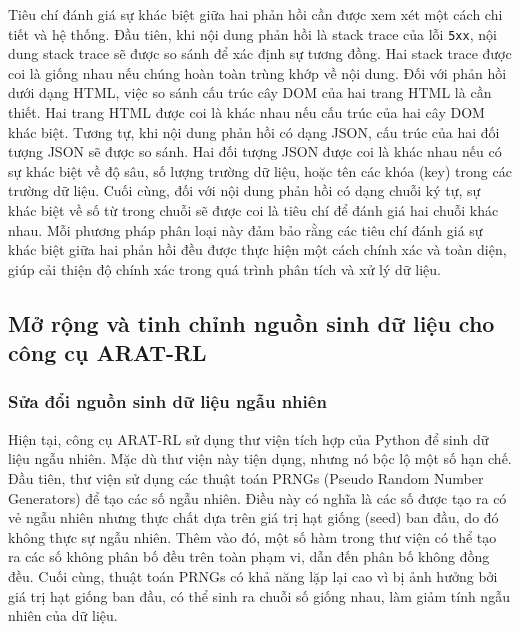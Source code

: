 Tiêu chí đánh giá sự khác biệt giữa hai phản hồi cần được xem xét một cách chi tiết và hệ thống. Đầu tiên, khi nội dung phản hồi là stack trace của lỗi \texttt{5xx}, nội dung stack trace sẽ được so sánh để xác định sự tương đồng. Hai stack trace được coi là giống nhau nếu chúng hoàn toàn trùng khớp về nội dung. Đối với phản hồi dưới dạng HTML, việc so sánh cấu trúc cây DOM của hai trang HTML là cần thiết. Hai trang HTML được coi là khác nhau nếu cấu trúc của hai cây DOM khác biệt. Tương tự, khi nội dung phản hồi có dạng JSON, cấu trúc của hai đối tượng JSON sẽ được so sánh. Hai đối tượng JSON được coi là khác nhau nếu có sự khác biệt về độ sâu, số lượng trường dữ liệu, hoặc tên các khóa (key) trong các trường dữ liệu. Cuối cùng, đối với nội dung phản hồi có dạng chuỗi ký tự, sự khác biệt về số từ trong chuỗi sẽ được coi là tiêu chí để đánh giá hai chuỗi khác nhau. Mỗi phương pháp phân loại này đảm bảo rằng các tiêu chí đánh giá sự khác biệt giữa hai phản hồi đều được thực hiện một cách chính xác và toàn diện, giúp cải thiện độ chính xác trong quá trình phân tích và xử lý dữ liệu.














\subsection{Mở rộng và tinh chỉnh nguồn sinh dữ liệu cho công cụ ARAT-RL}
\subsubsection{Sửa đổi nguồn sinh dữ liệu ngẫu nhiên}
Hiện tại, công cụ ARAT-RL sử dụng thư viện tích hợp của Python để sinh dữ liệu ngẫu nhiên. Mặc dù thư viện này tiện dụng, nhưng nó bộc lộ một số hạn chế. Đầu tiên, thư viện sử dụng các thuật toán PRNGs (Pseudo Random Number Generators) để tạo các số ngẫu nhiên. Điều này có nghĩa là các số được tạo ra có vẻ ngẫu nhiên nhưng thực chất dựa trên giá trị hạt giống (seed) ban đầu, do đó không thực sự ngẫu nhiên. Thêm vào đó, một số hàm trong thư viện có thể tạo ra các số không phân bố đều trên toàn phạm vi, dẫn đến phân bố không đồng đều. Cuối cùng, thuật toán PRNGs có khả năng lặp lại cao vì bị ảnh hưởng bởi giá trị hạt giống ban đầu, có thể sinh ra chuỗi số giống nhau, làm giảm tính ngẫu nhiên của dữ liệu.



